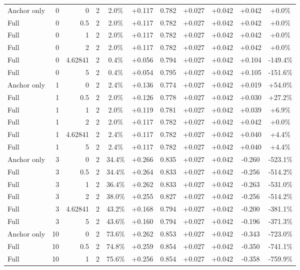 \begin{table}[htbp]
\begin{tabular}{lrrrccccccc}
Anchor only & 0 & 0 & 2 & 2.0\% & +0.117 & 0.782 & +0.027 & +0.042 & +0.042 & +0.0\% \\
Full & 0 & 0.5 & 2 & 2.0\% & +0.117 & 0.782 & +0.027 & +0.042 & +0.042 & +0.0\% \\
Full & 0 & 1 & 2 & 2.0\% & +0.117 & 0.782 & +0.027 & +0.042 & +0.042 & +0.0\% \\
Full & 0 & 2 & 2 & 2.0\% & +0.117 & 0.782 & +0.027 & +0.042 & +0.042 & +0.0\% \\
Full & 0 & 4.62841 & 2 & 0.4\% & +0.056 & 0.794 & +0.027 & +0.042 & +0.104 & -149.4\% \\
Full & 0 & 5 & 2 & 0.4\% & +0.054 & 0.795 & +0.027 & +0.042 & +0.105 & -151.6\% \\
Anchor only & 1 & 0 & 2 & 2.4\% & +0.136 & 0.774 & +0.027 & +0.042 & +0.019 & +54.0\% \\
Full & 1 & 0.5 & 2 & 2.0\% & +0.126 & 0.778 & +0.027 & +0.042 & +0.030 & +27.2\% \\
Full & 1 & 1 & 2 & 2.0\% & +0.119 & 0.781 & +0.027 & +0.042 & +0.039 & +6.9\% \\
Full & 1 & 2 & 2 & 2.0\% & +0.117 & 0.782 & +0.027 & +0.042 & +0.042 & +0.0\% \\
Full & 1 & 4.62841 & 2 & 2.4\% & +0.117 & 0.782 & +0.027 & +0.042 & +0.040 & +4.4\% \\
Full & 1 & 5 & 2 & 2.4\% & +0.117 & 0.782 & +0.027 & +0.042 & +0.040 & +4.4\% \\
Anchor only & 3 & 0 & 2 & 34.4\% & +0.266 & 0.835 & +0.027 & +0.042 & -0.260 & -523.1\% \\
Full & 3 & 0.5 & 2 & 34.4\% & +0.264 & 0.833 & +0.027 & +0.042 & -0.256 & -514.2\% \\
Full & 3 & 1 & 2 & 36.4\% & +0.262 & 0.833 & +0.027 & +0.042 & -0.263 & -531.0\% \\
Full & 3 & 2 & 2 & 38.0\% & +0.255 & 0.827 & +0.027 & +0.042 & -0.256 & -514.2\% \\
Full & 3 & 4.62841 & 2 & 43.2\% & +0.168 & 0.794 & +0.027 & +0.042 & -0.200 & -381.1\% \\
Full & 3 & 5 & 2 & 43.6\% & +0.160 & 0.794 & +0.027 & +0.042 & -0.196 & -371.3\% \\
Anchor only & 10 & 0 & 2 & 73.6\% & +0.262 & 0.853 & +0.027 & +0.042 & -0.343 & -723.0\% \\
Full & 10 & 0.5 & 2 & 74.8\% & +0.259 & 0.854 & +0.027 & +0.042 & -0.350 & -741.1\% \\
Full & 10 & 1 & 2 & 75.6\% & +0.256 & 0.854 & +0.027 & +0.042 & -0.358 & -759.9\% \\

\end{tabular}
\end{table}
